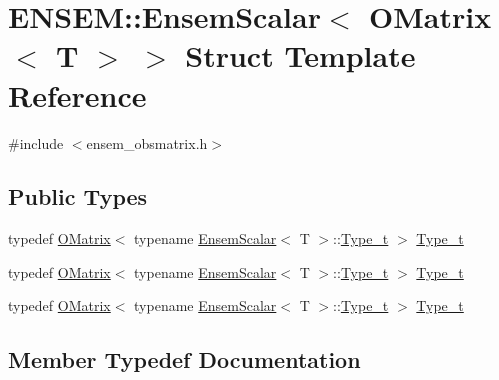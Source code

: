 \hypertarget{structENSEM_1_1EnsemScalar_3_01OMatrix_3_01T_01_4_01_4}{}\section{E\+N\+S\+EM\+:\+:Ensem\+Scalar$<$ O\+Matrix$<$ T $>$ $>$ Struct Template Reference}
\label{structENSEM_1_1EnsemScalar_3_01OMatrix_3_01T_01_4_01_4}


{\ttfamily \#include $<$ensem\+\_\+obsmatrix.\+h$>$}

\subsection*{Public Types}
\begin{DoxyCompactItemize}
\item 
typedef \mbox{\hyperlink{classENSEM_1_1OMatrix}{O\+Matrix}}$<$ typename \mbox{\hyperlink{structENSEM_1_1EnsemScalar}{Ensem\+Scalar}}$<$ T $>$\+::\mbox{\hyperlink{structENSEM_1_1EnsemScalar_3_01OMatrix_3_01T_01_4_01_4_ae82c62e546f488affe11e2bd214d3279}{Type\+\_\+t}} $>$ \mbox{\hyperlink{structENSEM_1_1EnsemScalar_3_01OMatrix_3_01T_01_4_01_4_ae82c62e546f488affe11e2bd214d3279}{Type\+\_\+t}}
\item 
typedef \mbox{\hyperlink{classENSEM_1_1OMatrix}{O\+Matrix}}$<$ typename \mbox{\hyperlink{structENSEM_1_1EnsemScalar}{Ensem\+Scalar}}$<$ T $>$\+::\mbox{\hyperlink{structENSEM_1_1EnsemScalar_3_01OMatrix_3_01T_01_4_01_4_ae82c62e546f488affe11e2bd214d3279}{Type\+\_\+t}} $>$ \mbox{\hyperlink{structENSEM_1_1EnsemScalar_3_01OMatrix_3_01T_01_4_01_4_ae82c62e546f488affe11e2bd214d3279}{Type\+\_\+t}}
\item 
typedef \mbox{\hyperlink{classENSEM_1_1OMatrix}{O\+Matrix}}$<$ typename \mbox{\hyperlink{structENSEM_1_1EnsemScalar}{Ensem\+Scalar}}$<$ T $>$\+::\mbox{\hyperlink{structENSEM_1_1EnsemScalar_3_01OMatrix_3_01T_01_4_01_4_ae82c62e546f488affe11e2bd214d3279}{Type\+\_\+t}} $>$ \mbox{\hyperlink{structENSEM_1_1EnsemScalar_3_01OMatrix_3_01T_01_4_01_4_ae82c62e546f488affe11e2bd214d3279}{Type\+\_\+t}}
\end{DoxyCompactItemize}


\subsection{Member Typedef Documentation}
\mbox{\label{structENSEM_1_1EnsemScalar_3_01OMatrix_3_01T_01_4_01_4_ae82c62e546f488affe11e2bd214d3279}} 
